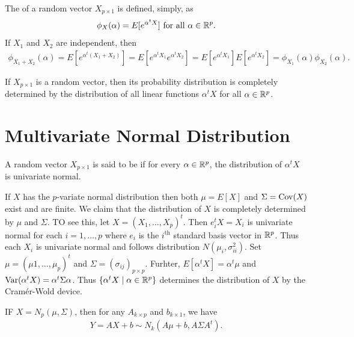 The  of a random vector $X_{p \times 1}$ is defined, simply, as
\begin{align}
    \phi_{X}(\alpha) = E[e^{\alpha^{t}X}] \text{ for all } \alpha \in \mathbb{R}^{p}.
\end{align}
If $X_{1}$ and $X_{2}$ are independent, then
\begin{align}
    \phi_{X_{1}+X_{2}}(\alpha) = E[e^{\alpha^{t}(X_{1}+X_{2})}] = E[e^{\alpha^{t}X_{1}}e^{\alpha^{t}X_{2}}] = E[e^{\alpha^{t}X_{1}}]E[e^{\alpha^{t}X_{2}}] = \phi_{X_{1}}(\alpha)\phi_{X_{2}}(\alpha).
\end{align}

\begin{theorem}
    If $X_{p \times 1}$ is a random vector, then its probability distribution is completely determined by the distribution of all linear functions $\alpha^{t}X$ for all $\alpha \in \mathbb{R}^{p}$.
\end{theorem}

\section{Multivariate Normal Distribution}

\begin{definition}
    A random vector $X_{p \times 1}$ is said to be  if for every $\alpha \in \mathbb{R}^{p}$, the distribution of $\alpha^{t}X$ is univariate normal.
\end{definition}
If $X$ has the $p$-variate normal distribution then both $\mu = E[X]$ and $\Sigma = \operatorname{Cov}(X)$ exist and are finite. We claim that the distribution of $X$ is completely determined by $\mu$ and $\Sigma$. TO see this, let $X = (X_{1},\ldots,X_{p})^{t}$. Then $e_{i}^{t}X = X_{i}$ is univariate normal for each $i = 1,\ldots,p$ where $e_{i}$ is the $i^{\text{th}}$ standard basis vector in $\mathbb{R}^{p}$. Thus each $X_{i}$ is univariate normal and follows distribution $N(\mu_{i},\sigma_{ii}^{2})$. Set $\mu = (\mu{1},\ldots,\mu_{p})^{t}$ and $\Sigma = (\sigma_{ij})_{p \times p}$. Furhter, $E[\alpha^{t}X] = \alpha^{t}\mu$ and $\operatorname{Var}(\alpha^{t}X) = \alpha^{t}\Sigma \alpha$. Thus $\{\alpha^{t}X \mid \alpha \in \mathbb{R}^{p}\}$ determines the distribution of $X$ by the Cramér-Wold device.

IF $X = N_{p}(\mu,\Sigma)$, then for any $A_{k \times p}$ and $b_{k \times 1}$, we have
\begin{align}
    Y = AX + b \sim N_{k}(A\mu + b, A\Sigma A^{t}).
\end{align}

